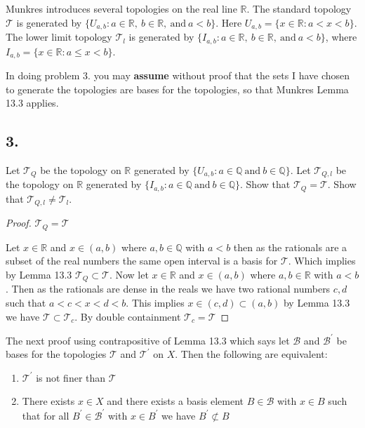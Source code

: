 \documentclass{amsart}
\theoremstyle{plain}
\theoremstyle{definition}
\theoremstyle{remark}
\begin{document}
\vspace{.15in}

Munkres introduces several topologies on the real line $\mathbb R$. The standard topology $\mathcal T$ is generated by $\{ U_{a, b} : a\in \mathbb R, \ b\in \mathbb R, \ \mbox{and} \ a < b\}$. Here $U_{a, b} = \{ x\in \mathbb R : a < x < b\}$. The lower limit topology $\mathcal T _l$ is generated by $\{ I_{a, b} : a\in \mathbb R, \ b\in \mathbb R, \ \mbox{and} \ a < b\}$, where $I_{a, b} = \{ x\in \mathbb R : a \le x < b\}$.

In doing problem 3. you may {\bfseries assume} without proof that the sets I have chosen to generate the topologies are bases for the topologies, so that Munkres Lemma 13.3 applies.



\vspace{.15in}

\noindent
\subsection*{3.}  Let $\mathcal T _Q$ be the topology on $\mathbb R$ generated by $\{ U_{a, b} : a\in \mathbb Q \ \mbox{and} \ b\in \mathbb Q \}$. Let $\mathcal T _{Q,l}$ be the topology on $\mathbb R$ generated by $\{ I_{a, b} : a\in \mathbb Q \ \mbox{and} \ b\in \mathbb Q \}$. Show that $\mathcal T _Q = \mathcal T$. Show that $\mathcal T _{Q,l} \ne \mathcal T _l$.

\begin{proof}{${\mathcal{T}_Q=\mathcal{T}}$}
    
    Let $x\in \mathbb{R}$ and $x\in (a,b)$ where $a,b\in \mathbb{Q}$ with $a<b$ then as the rationals are a subset of the real numbers the same open interval is a basis for $\mathcal {T}$. Which implies by Lemma 13.3 $\mathcal{T}_Q\subset \mathcal{T}$.
    Now let $x\in \mathbb{R}$ and $x\in (a,b)$ where $a,b \in \mathbb{R}$ with $a<b$. Then as the rationals are dense in the reals we have two rational numbers $c,d$ such that $a<c<x<d<b$. This implies $x\in (c,d)\subset (a,b)$ by Lemma 13.3 we have $\mathcal T\subset \mathcal T_c$.
    By double containment $\mathcal T_c= \mathcal T$
 

\end{proof}
\vspace{.15in}

The next proof using contrapositive of Lemma 13.3 which says let $\mathcal{B}$ and $\mathcal{B}^\prime$ be bases for the topologies $\mathcal{T}$ and $\mathcal{T}^\prime$ on $X$. Then the following are equivalent:
\begin{enumerate}
    \item $\mathcal{T}^\prime$ is not finer than $\mathcal{T}$
    \item There exists $x\in X$ and there exists a basis element $B\in \mathcal{B}$ with $x\in B$ such that for all $B^\prime\in \mathcal{B}^\prime$ with $x\in B^\prime$ we have $B^\prime \not \subset B$
\end{enumerate}
\end{document}
